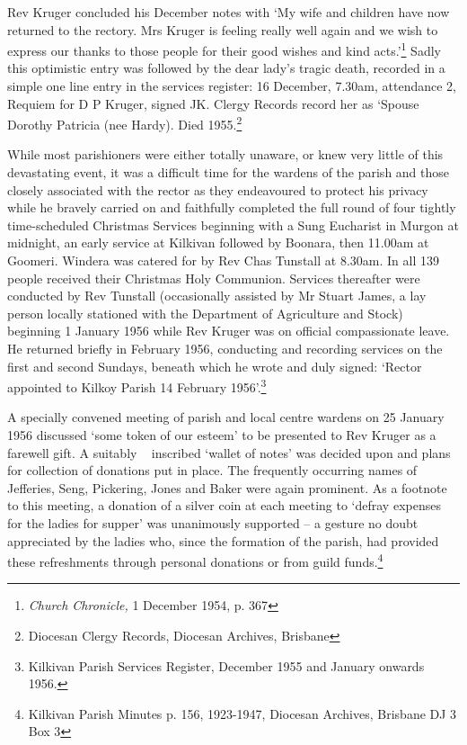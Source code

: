 Rev Kruger concluded his December notes with `My wife and children have now returned to the rectory. Mrs Kruger is feeling really well again and we wish to express our thanks to those people for their good wishes and kind acts.'\footnote{\emph{Church Chronicle,} 1 December 1954, p. 367} Sadly this optimistic entry was followed by the dear lady's tragic death, recorded in a simple one line entry in the services register: 16 December, 7.30am, attendance 2, Requiem for D P Kruger, signed JK. Clergy Records record her as `Spouse Dorothy Patricia (nee Hardy). Died 1955.\footnote{Diocesan Clergy Records, Diocesan Archives, Brisbane}

While most parishioners were either totally unaware, or knew very little of this devastating event, it was a difficult time for the wardens of the parish and those closely associated with the rector as they endeavoured to protect his privacy while he bravely carried on and faithfully completed the full round of four tightly time-scheduled Christmas Services beginning with a Sung Eucharist in Murgon at midnight, an early service at Kilkivan followed by Boonara, then 11.00am at Goomeri. Windera was catered for by Rev Chas Tunstall at 8.30am. In all 139 people received their Christmas Holy Communion. Services thereafter were conducted by Rev Tunstall (occasionally assisted by Mr Stuart James, a lay person locally stationed with the Department of Agriculture and Stock) beginning 1 January 1956 while Rev Kruger was on official compassionate leave. He returned briefly in February 1956, conducting and recording services on the first and second Sundays, beneath which he wrote and duly signed: `Rector appointed to Kilkoy Parish 14 February 1956'.\footnote{Kilkivan Parish Services Register, December 1955 and January onwards 1956.}

A specially convened meeting of parish and local centre wardens on 25 January 1956 discussed `some token of our esteem' to be presented to Rev Kruger as a farewell gift. A suitably ~ inscribed `wallet of notes' was decided upon and plans for collection of donations put in place. The frequently occurring names of Jefferies, Seng, Pickering, Jones and Baker were again prominent. As a footnote to this meeting, a donation of a silver coin at each meeting to `defray expenses for the ladies for supper' was unanimously supported -- a gesture no doubt appreciated by the ladies who, since the formation of the parish, had provided these refreshments through personal donations or from guild funds.\footnote{Kilkivan Parish Minutes p. 156, 1923-1947, Diocesan Archives, Brisbane DJ 3 Box 3}

